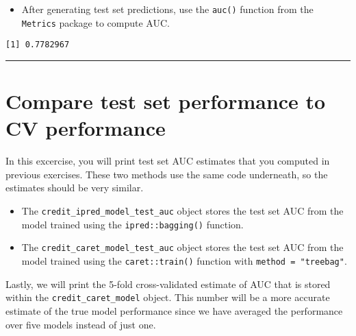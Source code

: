 \documentclass[
]{book}
\newenvironment{Shaded}{\begin{snugshade}}{\end{snugshade}}
\newcommand{\CommentTok}[1]{\textcolor[rgb]{0.56,0.35,0.01}{\textit{#1}}}
\newcommand{\DataTypeTok}[1]{\textcolor[rgb]{0.13,0.29,0.53}{#1}}
\newcommand{\DecValTok}[1]{\textcolor[rgb]{0.00,0.00,0.81}{#1}}
\newcommand{\KeywordTok}[1]{\textcolor[rgb]{0.13,0.29,0.53}{\textbf{#1}}}
\newcommand{\NormalTok}[1]{#1}
\newcommand{\OperatorTok}[1]{\textcolor[rgb]{0.81,0.36,0.00}{\textbf{#1}}}
\newcommand{\StringTok}[1]{\textcolor[rgb]{0.31,0.60,0.02}{#1}}
\providecommand{\tightlist}{%
  \setlength{\itemsep}{0pt}\setlength{\parskip}{0pt}}
\begin{document}
\begin{itemize}
\tightlist
\item
  After generating test set predictions, use the \texttt{auc()} function from the \texttt{Metrics} package to compute AUC.
\end{itemize}

\begin{Shaded}
\end{Shaded}

\begin{verbatim}
[1] 0.7782967
\end{verbatim}

\begin{center}\rule{0.5\linewidth}{0.5pt}\end{center}

\hypertarget{compare-test-set-performance-to-cv-performance}{%
\section{Compare test set performance to CV performance}\label{compare-test-set-performance-to-cv-performance}}

In this excercise, you will print test set AUC estimates that you computed in previous exercises. These two methods use the same code underneath, so the estimates should be very similar.

\begin{itemize}
\item
  The \texttt{credit\_ipred\_model\_test\_auc} object stores the test set AUC from the model trained using the \texttt{ipred::bagging()} function.
\item
  The \texttt{credit\_caret\_model\_test\_auc} object stores the test set AUC from the model trained using the \texttt{caret::train()} function with \texttt{method\ =\ "treebag"}.
\end{itemize}

Lastly, we will print the 5-fold cross-validated estimate of AUC that is stored within the \texttt{credit\_caret\_model} object. This number will be a more accurate estimate of the true model performance since we have averaged the performance over five models instead of just one.
\end{document}

